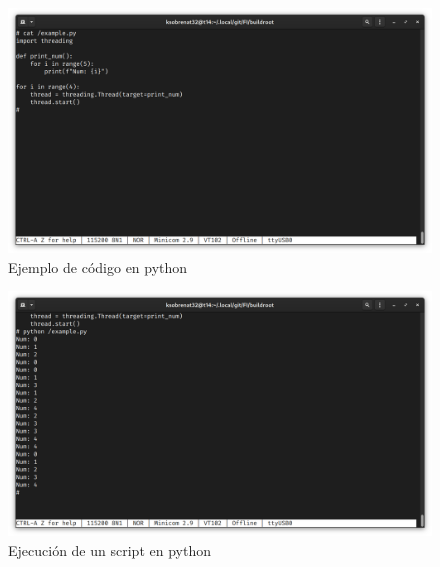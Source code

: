 \documentclass[12pt, letterpaper]{article}
\begin{document}
	\begin{figure}[H]
		\centering
		\begin{center}
			\includegraphics[width=\textwidth]{img/run-example-03}
			\caption{Ejemplo de código en python}
			\label{fig:boot}
		\end{center}
	\end{figure}


	\begin{figure}[H]
		\centering
		\begin{center}
			\includegraphics[width=\textwidth]{img/run-example-04}
			\caption{Ejecución de un script en python}
			\label{fig:boot}
		\end{center}
	\end{figure}
\end{document}
